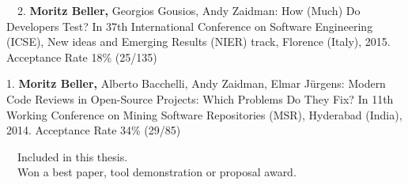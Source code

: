\begin{etaremune}
{\item[\faFileTextO~~2.] \textbf{Moritz Beller,} Georgios Gousios, Andy Zaidman: How (Much) Do
  Developers Test? In 37th International Conference on Software Engineering (ICSE), New ideas and
  Emerging Results (NIER) track, Florence (Italy), 2015. Acceptance Rate 18\% (25/135)

\item[1.] \textbf{Moritz Beller,} Alberto Bacchelli, Andy Zaidman, Elmar Jürgens:
  Modern Code Reviews in Open-Source Projects: Which Problems Do They Fix? In 11th Working
  Conference on Mining Software Repositories (MSR), Hyderabad (India), 2014. Acceptance Rate 34\% (29/85)

}\end{etaremune}

\vspace{0.5cm}
\noindent
\faFileTextO~~Included in this thesis.\\
\faTrophy~~Won a best paper, tool demonstration or proposal award.
